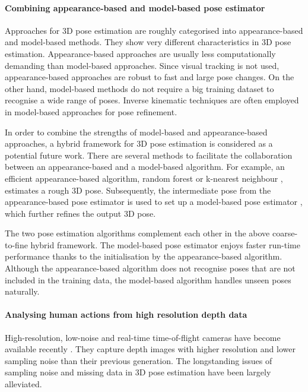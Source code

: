 \paragraph{Combining appearance-based and model-based pose estimator}

Approaches for 3D pose estimation are roughly categorised into appearance-based and model-based methods.  They show very different characteristics in 3D pose estimation.
Appearance-based approaches are usually less computationally demanding than model-based approaches. 
Since visual tracking is not used, appearance-based approaches are robust to fast and large pose changes.
On the other hand, model-based methods do not require a big training dataset to recognise a wide range of poses. Inverse kinematic techniques are often employed in model-based approaches for pose refinement. 

In order to combine the strengths of model-based and appearance-based approaches, a hybrid framework for 3D pose estimation is considered as a potential future work.
There are several methods to facilitate the collaboration between an appearance-based and a model-based algorithm.  
For example, an efficient appearance-based algorithm, \eg random forest or k-nearest neighbour \cite{Keskin2012, Baak2011, Ye2011}, estimates a rough 3D pose. Subsequently, the intermediate pose from the appearance-based pose estimator is used to set up a model-based pose estimator \cite{Pons-Moll2011, Sigal2012, Oikonomidis2011}, which further refines the output 3D pose.

The two pose estimation algorithms complement each other in the above coarse-to-fine hybrid framework.
The model-based pose estimator enjoys faster run-time performance thanks to the initialisation by the appearance-based algorithm. Although the appearance-based algorithm does not recognise poses that are not included in the training data, the model-based algorithm handles unseen poses naturally.

\paragraph{Analysing human actions from high resolution depth data}

High-resolution, low-noise and real-time time-of-flight cameras have become available recently \cite{Nair2012}. 
They capture depth images with higher resolution and lower sampling noise than their previous generation.
The longstanding issues of sampling noise and missing data in 3D pose estimation have been largely alleviated. 

